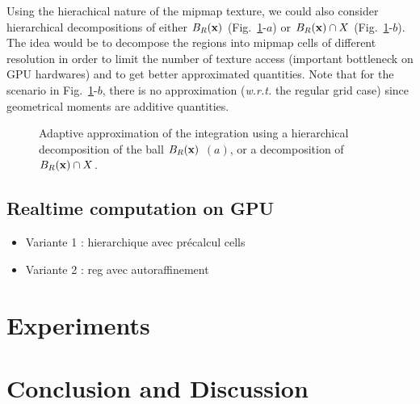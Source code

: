\documentclass{llncs}
\newcommand{\wrt}{\emph{w.r.t.} }
\begin{document}
Using the hierachical nature of the mipmap texture, we could also
consider hierarchical decompositions of either $B_R(\mathbf{x})$
(Fig.~\ref{fig:approx2}-$a$) or $B_R(\mathbf{x})\cap X$
(Fig.~\ref{fig:approx2}-$b$). The idea would be to decompose the
regions into mipmap cells of different resolution in order to limit
the number of texture access (important bottleneck on GPU hardwares)
and to get better approximated quantities. Note that for the scenario
in Fig.~\ref{fig:approx2}-$b$, there is no approximation (\wrt the
regular grid case) since  geometrical moments are additive quantities.
\begin{figure}
  \begin{center}
  \end{center}
  \caption{Adaptive approximation of the integration using a
    hierarchical decomposition of the ball $B_R(\mathbf{x})$ $(a)$, or a decomposition of $B_R(\mathbf{x})\cap X$.}
  \label{fig:approx2}
\end{figure}


\subsection{Realtime computation on GPU}
\begin{itemize}
\item   Variante 1 : hierarchique avec précalcul cells
\item   Variante 2 : reg avec autoraffinement
\end{itemize}




\section{Experiments}
\label{sec:experiments}



\section{Conclusion and Discussion}
\label{sec:discussion}
\end{document}
